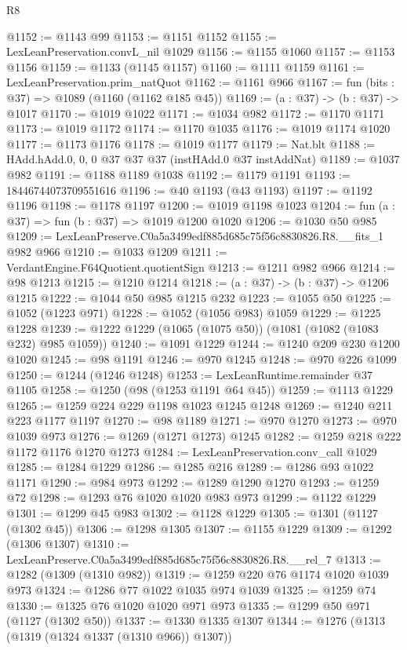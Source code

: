 \begin{lexlean}{R8}
\begin{coremodule}
@1152 := @1143 @99
@1153 := @1151 @1152
@1155 := LexLeanPreservation.convL_nil @1029
@1156 := @1155 @1060
@1157 := @1153 @1156
@1159 := @1133 (@1145 @1157)
@1160 := @1111 @1159
@1161 := LexLeanPreservation.prim_natQuot
@1162 := @1161 @966
@1167 := fun (bits : @37) => @1089 (@1160 (@1162 @185 @45))
@1169 := (a : @37) -> (b : @37) -> @1017
@1170 := @1019 @1022
@1171 := @1034 @982
@1172 := @1170 @1171
@1173 := @1019 @1172
@1174 := @1170 @1035
@1176 := @1019 @1174 @1020
@1177 := @1173 @1176
@1178 := @1019 @1177
@1179 := Nat.blt
@1188 := HAdd.hAdd.{0, 0, 0} @37 @37 @37 (instHAdd.{0} @37 instAddNat)
@1189 := @1037 @982
@1191 := @1188 @1189 @1038
@1192 := @1179 @1191
@1193 := 18446744073709551616
@1196 := @40 @1193 (@43 @1193)
@1197 := @1192 @1196
@1198 := @1178 @1197
@1200 := @1019 @1198 @1023
@1204 := fun (a : @37) => fun (b : @37) => @1019 @1200 @1020
@1206 := @1030 @50 @985
@1209 := LexLeanPreserve.C0a5a3499edf885d685c75f56c8830826.R8.__fits_1 @982 @966
@1210 := @1033 @1209
@1211 := VerdantEngine.F64Quotient.quotientSign
@1213 := @1211 @982 @966
@1214 := @98 @1213
@1215 := @1210 @1214
@1218 := (a : @37) -> (b : @37) -> @1206 @1215
@1222 := @1044 @50 @985 @1215 @232
@1223 := @1055 @50
@1225 := @1052 (@1223 @971)
@1228 := @1052 (@1056 @983) @1059
@1229 := @1225 @1228
@1239 := @1222 @1229 (@1065 (@1075 @50)) (@1081 (@1082 (@1083 @232) @985 @1059))
@1240 := @1091 @1229
@1244 := @1240 @209 @230 @1200 @1020
@1245 := @98 @1191
@1246 := @970 @1245
@1248 := @970 @226 @1099
@1250 := @1244 (@1246 @1248)
@1253 := LexLeanRuntime.remainder @37 @1105
@1258 := @1250 (@98 (@1253 @1191 @64 @45))
@1259 := @1113 @1229
@1265 := @1259 @224 @229 @1198 @1023 @1245 @1248
@1269 := @1240 @211 @223 @1177 @1197
@1270 := @98 @1189
@1271 := @970 @1270
@1273 := @970 @1039 @973
@1276 := @1269 (@1271 @1273) @1245
@1282 := @1259 @218 @222 @1172 @1176 @1270 @1273
@1284 := LexLeanPreservation.conv_call @1029
@1285 := @1284 @1229
@1286 := @1285 @216
@1289 := @1286 @93 @1022 @1171
@1290 := @984 @973
@1292 := @1289 @1290 @1270
@1293 := @1259 @72
@1298 := @1293 @76 @1020 @1020 @983 @973
@1299 := @1122 @1229
@1301 := @1299 @45 @983
@1302 := @1128 @1229
@1305 := @1301 (@1127 (@1302 @45))
@1306 := @1298 @1305
@1307 := @1155 @1229
@1309 := @1292 (@1306 @1307)
@1310 := LexLeanPreserve.C0a5a3499edf885d685c75f56c8830826.R8.__rel_7
@1313 := @1282 (@1309 (@1310 @982))
@1319 := @1259 @220 @76 @1174 @1020 @1039 @973
@1324 := @1286 @77 @1022 @1035 @974 @1039
@1325 := @1259 @74
@1330 := @1325 @76 @1020 @1020 @971 @973
@1335 := @1299 @50 @971 (@1127 (@1302 @50))
@1337 := @1330 @1335 @1307
@1344 := @1276 (@1313 (@1319 (@1324 @1337 (@1310 @966)) @1307))

\end{coremodule}
\end{lexlean}
